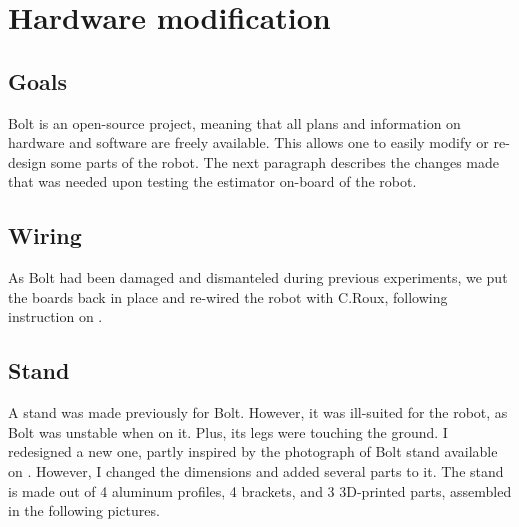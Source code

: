 \documentclass[a4paper,10pt]{article}
\begin{document}
\section{Hardware modification}
\subsection{Goals}
Bolt is an open-source project, meaning that all plans and information on hardware and software are freely available. This allows one to easily modify or re-design some parts of the robot.
The next paragraph describes the changes made that was needed upon testing the estimator on-board of the robot.


\subsection{Wiring}
As Bolt had been damaged and dismanteled during previous experiments, we put the boards back in place and re-wired the robot with C.Roux, following instruction on \cite{Git_hardware_bolt}.

\subsection{Stand}
A stand was made previously for Bolt. However, it was ill-suited for the robot, as Bolt was unstable when on it. Plus, its legs were touching the ground. I redesigned a new one, partly inspired by the photograph of Bolt stand available on \cite{Git_hardware_bolt}. However, I changed the dimensions and added several parts to it. The stand is made out of 4 aluminum profiles, 4 brackets, and 3 3D-printed parts, assembled in the following pictures.
\end{document}
